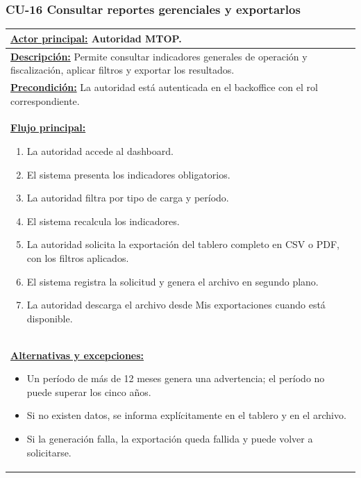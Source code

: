 \subsubsection{CU-16 Consultar reportes gerenciales y exportarlos}\label{sec:cu-16}
\begin{table}[H]
\small
\setlength{\tabcolsep}{8pt}
\renewcommand{\arraystretch}{1.1}
\centering
\begin{tabular}{|p{15.8cm}|}
\hline
\textbf{\underline{Actor principal:}} Autoridad MTOP. \\ \hline
\textbf{\underline{Descripción:}} Permite consultar indicadores generales de operación y fiscalización, aplicar filtros y exportar los resultados. \\ \hline
\textbf{\underline{Precondición:}} La autoridad está autenticada en el backoffice con el rol correspondiente. \\ \hline
\textbf{\underline{Flujo principal:}}\par
\begin{enumerate}[leftmargin=*,topsep=2pt,itemsep=1pt,parsep=0pt,partopsep=0pt]
    \item La autoridad accede al dashboard.
    \item El sistema presenta los indicadores obligatorios.
    \item La autoridad filtra por tipo de carga y período.
    \item El sistema recalcula los indicadores.
    \item La autoridad solicita la exportación del tablero completo en CSV o PDF, con los filtros aplicados.
    \item El sistema registra la solicitud y genera el archivo en segundo plano.
    \item La autoridad descarga el archivo desde Mis exportaciones cuando está disponible.
\end{enumerate} \\ \hline
\textbf{\underline{Alternativas y excepciones:}}\par
\begin{itemize}[leftmargin=*,topsep=2pt,itemsep=1pt,parsep=0pt,partopsep=0pt]
    \item Un período de más de 12 meses genera una advertencia; el período no puede superar los cinco años.
    \item Si no existen datos, se informa explícitamente en el tablero y en el archivo.
    \item Si la generación falla, la exportación queda fallida y puede volver a solicitarse.

\end{itemize}
\end{tabular}
\end{table}
